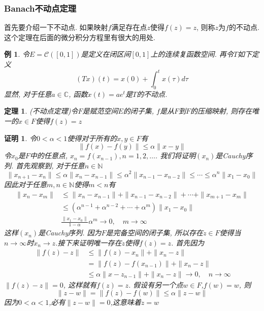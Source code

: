 \documentclass[a4paper,11pt]{article}
\theoremstyle{mystyle}
\newtheorem{theorem}{\hspace{2em}定理}[section]
\newtheorem{Proof}{\hspace{2em}证明}[section]
\newtheorem{example}{\hspace{2em}例}[section]
\begin{document}
\subsubsection*{Banach不动点定理}
首先要介绍一下不动点. 如果映射$f$满足存在点$z$使得$f(z)=z$, 则称$z$为$f$的不动点. 这个定理在后面的微分积分方程里有很大的用处.
\begin{example}
  令$E=\mathcal{C}([0,1])$是定义在闭区间$[0,1]$上的连续复函数空间. 再令$T$如下定义
  \begin{equation*}
    (Tx)(t)=x(0)+\int_{0}^{t}x(\tau)d\tau
  \end{equation*}
  显然, 对于任意$a\in \mathbb{C}$, 函数$x(t)=ae^t$是$T$的不动点.
\end{example}
\begin{theorem}
  (不动点定理)令$F$是赋范空间$E$的闭子集, $f$是从$F$到$F$的压缩映射, 则存在唯一的$x\in F$使得$f(z)=z$
\end{theorem}
\begin{Proof}
  令$0<\alpha<1$使得对于所有的$x,y\in F$有
  \begin{equation*}
    \|f(x)-f(y)\|\leq\alpha\|x-y\|
  \end{equation*}
  令$x_0$是$F$中的任意点, $x_n=f(x_{n-1}),n=1,2,\dots$. 我们将证明$(x_n)$是Cauchy序列. 首先观察到, 对于任意$n\in \mathbb{N}$
  \begin{equation*}
    \|x_{n+1}-x_n\|\leq\alpha\|x_n-x_{n-1}\|\leq\alpha^2\|x_{n-1}-x_{n-2}\|\leq\cdots\leq\alpha^n\|x_1-x_0\|
  \end{equation*}
  因此对于任意$m,n\in\mathbb{N}$使得$m<n$有
  \begin{equation*}
  \begin{split}
     \|x_n-x_m\| & \leq\|x_n-x_{n-1}\|+\|x_{n-1}-x_{n-2}\|+\cdots+\|x_{m+1}-x_{m}\| \\
       & \leq(\alpha^{n-1}+\alpha^{n-2}+\cdots+\alpha^m)\|x_1-x_0\| \\
       & \frac{\|x_1-x_0\|}{1-\alpha}\alpha^m\to 0,\quad m\to\infty
  \end{split}
  \end{equation*}
  这样$(x_n)$是Cauchy序列. 因为$F$是完备空间的闭子集, 所以存在$z\in F$使得当$n\to\infty$时$x_n\to z$.接下来证明唯一存在$z$使得$f(z)=z$.
  首先因为
  \begin{equation*}\
  \begin{split}
     \|f(z)-z\|&\leq\|f(z)-x_n\|+\|x_n-z\| \\
       &=\|f(z)-f(x_{n-1})\|+\|x_n-z\| \\
       &\leq\alpha\|x-z_{n-1}\|+\|x_n-z\|\to 0,\quad n\to\infty
  \end{split}
  \end{equation*}
  $\|f(z)-z\|=0$, 这样就有$f(z)=z$. 假设有另一个点$w\in F$,$f(w)=w$, 则
  \begin{equation*}
    \|z-w\|=\|f(z)-f(w)\|\leq\alpha\|z-w\|
  \end{equation*}
  因为$0<\alpha<1$,必有$\|z-w\|=0$,这意味着$z=w$
\end{Proof}
\end{document}
